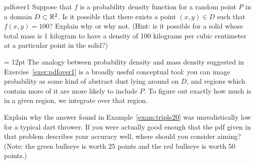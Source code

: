 \documentclass{watsonbook}
\begin{document}
\begin{exercise}{}{pdfover1}
  Suppose that $f$ is a probability density function for a random point $P$ in a domain $D\subset \mathbb{R}^2$. Is it possible that there exists a point $(x,y) \in D$ such that $f(x,y) = 100$? Explain why or why not. (Hint: is it possible for a solid whose total mass is 1 kilogram to have a density of 100 kilograms per cubic centimeter at a particular point in the solid?)
\end{exercise}

\begin{minipage}[t]{0.55\textwidth} \parskip = 12pt 
  The analogy between probability density and mass density suggested
  in Exercise~\ref{exer:pdfover1} is a broadly useful conceptual tool:
  you can image probability as some kind of abstract dust lying around
  on $D$, and regions which contain more of it are more likely to
  include $P$. To figure out exactly how much is in a given region, we
  integrate over that region. 

  \begin{exercise}{}{}
    Explain why the answer found in Example~\ref{exam:triple20} was
    unrealistically low for a typical dart thrower. If you were
    actually good enough that the pdf given in that problem describes
    your accuracy well, where should you consider aiming? (Note: the green
    bullseye is worth 25 points and the red bullseye is worth 50
    points.)
  \end{exercise}
\end{minipage} \hfill
\end{document}
